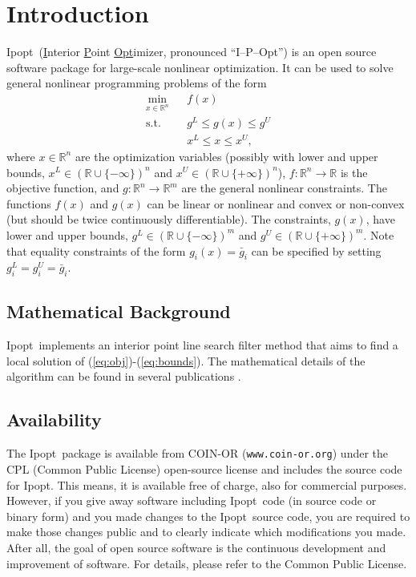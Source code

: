 \documentclass[10pt]{article}
\newcommand{\RR}{{\mathbb{R}}}
\newcommand{\Ipopt}{{\sc Ipopt}}
\begin{document}
\section{Introduction}
\Ipopt\ (\underline{I}nterior \underline{P}oint \underline{Opt}imizer,
pronounced ``I--P--Opt'') is an open source software package for
large-scale nonlinear optimization. It can be used to solve general
nonlinear programming problems of the form
\begin{eqnarray}
\min_{x\in\RR^n} &&f(x) \label{eq:obj} \\
\mbox{s.t.} \;  &&g^L \leq g(x) \leq g^U \\
                &&x^L \leq x \leq x^U, \label{eq:bounds}
\end{eqnarray}
where $x \in \RR^n$ are the optimization variables (possibly with
lower and upper bounds, $x^L\in(\RR\cup\{-\infty\})^n$ and
$x^U\in(\RR\cup\{+\infty\})^n$), $f:\RR^n\longrightarrow\RR$ is the
objective function, and $g:\RR^n\longrightarrow \RR^m$ are the general
nonlinear constraints.  The functions $f(x)$ and $g(x)$ can be linear
or nonlinear and convex or non-convex (but should be twice
continuously differentiable). The constraints, $g(x)$, have lower and
upper bounds, $g^L\in(\RR\cup\{-\infty\})^m$ and
$g^U\in(\RR\cup\{+\infty\})^m$. Note that equality constraints of the
form $g_i(x)=\bar g_i$ can be specified by setting
$g^L_{i}=g^U_{i}=\bar g_i$.

\subsection{Mathematical Background}
\Ipopt\ implements an interior point line search filter method that
aims to find a local solution of (\ref{eq:obj})-(\ref{eq:bounds}).  The
mathematical details of the algorithm can be found in several
publications
\cite{NocWaeWal:adaptive,WaechterPhD,WaecBieg06:mp,WaeBie05:filterglobal,WaeBie05:filterlocal}.

\subsection{Availability}
The \Ipopt\ package is available from COIN-OR
(\texttt{www.coin-or.org}) under the CPL (Common Public License)
open-source license and includes the source code for \Ipopt.  This
means, it is available free of charge, also for commercial purposes.
However, if you give away software including \Ipopt\ code (in source
code or binary form) and you made changes to the \Ipopt\ source code,
you are required to make those changes public and to clearly indicate
which modifications you made.  After all, the goal of open source
software is the continuous development and improvement of software.
For details, please refer to the Common Public License.
\end{document}
